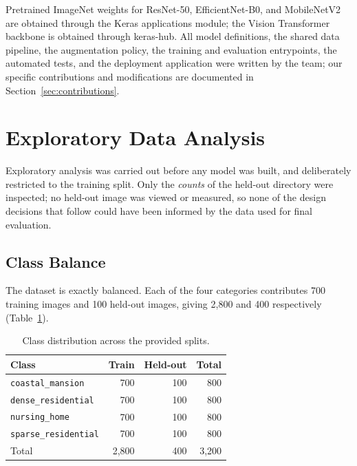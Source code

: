 \documentclass[11pt,twoside,a4paper]{article}
\begin{document}
Pretrained ImageNet weights for ResNet-50, EfficientNet-B0, and MobileNetV2 are
obtained through the Keras applications module; the Vision Transformer backbone
is obtained through keras-hub. All model definitions, the shared data pipeline,
the augmentation policy, the training and evaluation entrypoints, the automated
tests, and the deployment application were written by the team; our specific
contributions and modifications are documented in
Section~\ref{sec:contributions}.

\section{Exploratory Data Analysis}

Exploratory analysis was carried out before any model was built, and
deliberately restricted to the training split. Only the \emph{counts} of the
held-out directory were inspected; no held-out image was viewed or measured,
so none of the design decisions that follow could have been informed by the
data used for final evaluation.

\subsection{Class Balance}

The dataset is exactly balanced. Each of the four categories contributes 700
training images and 100 held-out images, giving 2{,}800 and 400 respectively
(Table~\ref{tab:class-balance}).

\begin{table}[H]
\centering
\caption{Class distribution across the provided splits.}
\label{tab:class-balance}
\small
\begin{tabular}{lrrr}
\toprule
Class & Train & Held-out & Total \\
\midrule
\texttt{coastal\_mansion}    & 700 & 100 & 800 \\
\texttt{dense\_residential}  & 700 & 100 & 800 \\
\texttt{nursing\_home}       & 700 & 100 & 800 \\
\texttt{sparse\_residential} & 700 & 100 & 800 \\
\midrule
Total & 2{,}800 & 400 & 3{,}200 \\
\bottomrule
\end{tabular}
\end{table}
\end{document}
